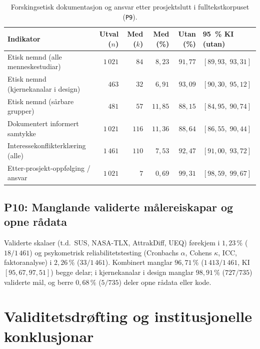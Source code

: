 \documentclass[11pt,a4paper]{article}
\begin{document}
\begin{table}[htbp]
\centering
\caption{Forskingsetisk dokumentasjon og ansvar etter prosjektslutt i fulltekstkorpuset (\texttt{P9}).}
\label{tab:etikk}
\footnotesize
\begin{tabular}{@{}lrrrrl@{}}
\toprule
\textbf{Indikator} & \textbf{Utval ($n$)} & \textbf{Med ($k$)} & \textbf{Med (\%)} & \textbf{Utan (\%)} & \textbf{95~\% KI (utan)} \\
\midrule
Etisk nemnd (alle menneskestudiar) & $1\,021$ & $84$ & $8{,}23$ & $91{,}77$ & $[89{,}93,\; 93{,}31]$ \\
Etisk nemnd (kjernekanalar i design) & $463$ & $32$ & $6{,}91$ & $93{,}09$ & $[90{,}30,\; 95{,}12]$ \\
Etisk nemnd (sårbare grupper) & $481$ & $57$ & $11{,}85$ & $88{,}15$ & $[84{,}95,\; 90{,}74]$ \\
Dokumentert informert samtykke & $1\,021$ & $116$ & $11{,}36$ & $88{,}64$ & $[86{,}55,\; 90{,}44]$ \\
Interessekonflikterklæring (alle) & $1\,461$ & $110$ & $7{,}53$ & $92{,}47$ & $[91{,}00,\; 93{,}72]$ \\
Etter-prosjekt-oppfølging / ansvar & $1\,021$ & $7$ & $0{,}69$ & $99{,}31$ & $[98{,}59,\; 99{,}67]$ \\
\bottomrule
\end{tabular}
\end{table}

\subsection{P10: Manglande validerte målereiskapar og opne rådata}
Validerte skalaer (t.d.\ SUS, NASA-TLX, AttrakDiff, UEQ) førekjem i $1{,}23\,\%$ ($18/1\,461$) og psykometrisk reliabilitetstesting (Cronbachs $\alpha$, Cohens $\kappa$, ICC, faktoranalyse) i $2{,}26\,\%$ ($33/1\,461$). Kombinert manglar $96{,}71\,\%$ ($1\,413/1\,461$, KI $[95{,}67, 97{,}51]$) begge delar; i kjernekanalar i design manglar $98{,}91\,\%$ ($727/735$) validerte mål, og berre $0{,}68\,\%$ ($5/735$) deler opne rådata eller kode.

\section{Validitetsdrøfting og institusjonelle konklusjonar}
\end{document}
